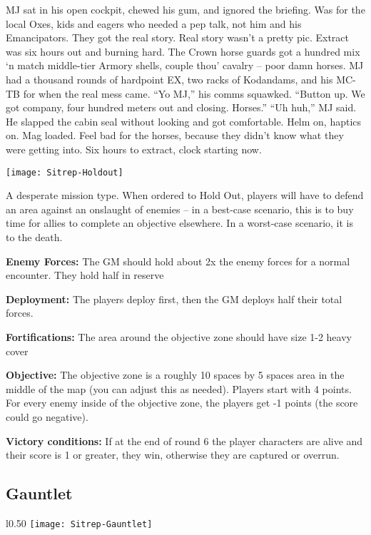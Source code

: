  MJ sat in his open cockpit, chewed his gum, and ignored the briefing. Was for the local Oxes, kids and eagers who needed a pep talk, not him and his Emancipators. They got the real story. Real story wasn’t a pretty pic. Extract was six hours out and burning hard. The Crown horse guards got a hundred mix ‘n match middle-tier Armory shells, couple thou’ cavalry -- poor damn horses. MJ had a thousand rounds of hardpoint EX, two racks of Kodandams, and his MC-TB for when the real mess came. “Yo MJ,” his comms squawked. “Button up. We got company, four hundred meters out and closing. Horses.” “Uh huh,” MJ said. He slapped the cabin seal without looking and got comfortable. Helm on, haptics on. Mag loaded. Feel bad for the horses, because they didn’t know what they were getting into. Six hours to extract, clock starting now.

 \begin{center}
   \texttt{[image: Sitrep-Holdout]}
 \end{center}
 
 A desperate mission type. When ordered to Hold Out, players will have to defend an area against an onslaught of enemies -- in a best-case scenario, this is to buy time for allies to complete an objective elsewhere. In a worst-case scenario, it is to the death.

 \textbf{Enemy Forces:} The GM should hold about 2x the enemy forces for a normal encounter. They hold half in reserve

 \textbf{Deployment:} The players deploy first, then the GM deploys half their total forces.

 \textbf{Fortifications:} The area around the objective zone should have size 1-2 heavy cover

 \textbf{Objective:} The objective zone is a roughly 10 spaces by 5 spaces area in the middle of the map (you can adjust this as needed). Players start with 4 points. For every enemy inside of the objective zone, the players get -1 points (the score could go negative).

 \textbf{Victory conditions:}  If at the end of round 6 the player characters are alive and their score is 1 or greater, they win, otherwise they are captured or overrun.


 \newpage
 \subsection{Gauntlet}

 \begin{wrapfigure}{l}{0.50\textwidth}
   \centering
   \texttt{[image: Sitrep-Gauntlet]}
 \end{wrapfigure}

